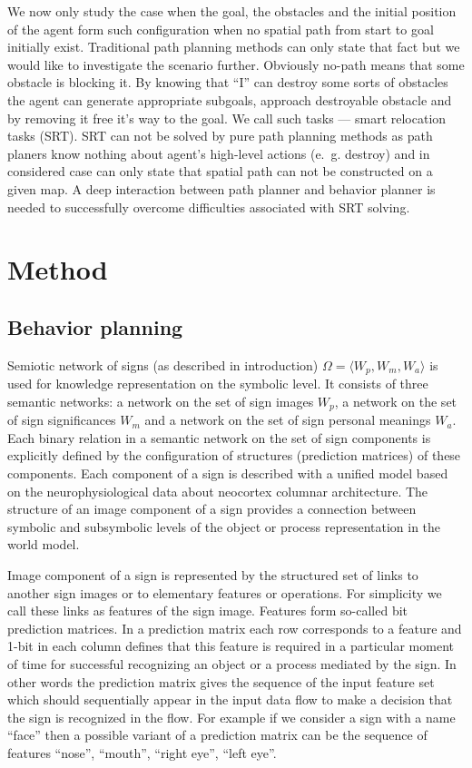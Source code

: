 \documentclass[procedia]{easychair}
\begin{document}
We now only study the case when the goal, the obstacles and the initial position of the agent form such configuration when no spatial path from start to goal initially exist. Traditional path planning methods can only state that fact but we would like to investigate the scenario further. Obviously no-path means that some obstacle is blocking it. By knowing that ``I'' can destroy some sorts of obstacles the agent can generate appropriate subgoals, approach destroyable obstacle and by removing it free it's way to the goal. We call such tasks --- smart relocation tasks (SRT). SRT can not be solved by pure path planning methods as path planers know nothing about agent's high-level actions (e.~g. destroy) and in considered case can only state that spatial path can not be constructed on a given map. A deep interaction between path planner and behavior planner is needed to successfully overcome difficulties associated with SRT solving.


\section{Method}
\label{sect:method}
\subsection{Behavior planning}
\label{sect:beh}

Semiotic network of signs (as described in introduction) $\Omega=\langle W_p,W_m,W_a\rangle$ is used for knowledge representation on the symbolic level. It consists of three semantic networks: a network on the set of sign images $W_p$, a network on the set of sign significances $W_m$ and a network on the set of sign personal meanings $W_a$. Each binary relation in a semantic network on the set of sign components is explicitly defined by the configuration of structures (prediction matrices) of these components. Each component of a sign is described with a unified model based on the neurophysiological data about neocortex columnar architecture. The structure of an image component of a sign provides a connection between symbolic and subsymbolic levels of the object or process representation in the world model.

Image component of a sign is represented by the structured set of links to another sign images or to elementary features or operations. For simplicity we call these links as features of the sign image. Features form so-called bit prediction matrices. In a prediction matrix each row corresponds to a feature and 1-bit in each column defines that this feature is required in a particular moment of time for successful recognizing an object or a process mediated by the sign. In other words the prediction matrix gives the sequence of the input feature set which should sequentially appear in the input data flow to make a decision that the sign is recognized in the flow. For example if we consider a sign with a name ``face'' then a possible variant of a prediction matrix can be the sequence of features ``nose'', ``mouth'', ``right eye'', ``left eye''.
\end{document}
